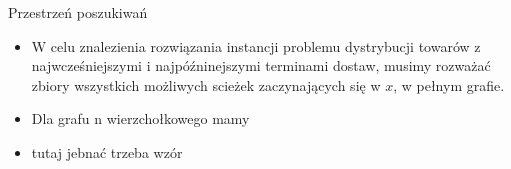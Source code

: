 \begin{block}{Przestrzeń poszukiwań}
\begin{itemize}
\item W celu znalezienia rozwiązania instancji problemu dystrybucji towarów z najwcześniejszymi i najpóźninejszymi terminami dostaw, musimy rozważać zbiory wszystkich możliwych scieżek zaczynających się w $x$, w pełnym grafie.
\pause
\item Dla grafu n wierzchołkowego mamy 
\pause
\item  tutaj jebnać trzeba wzór
\end{itemize}
\end{block}
